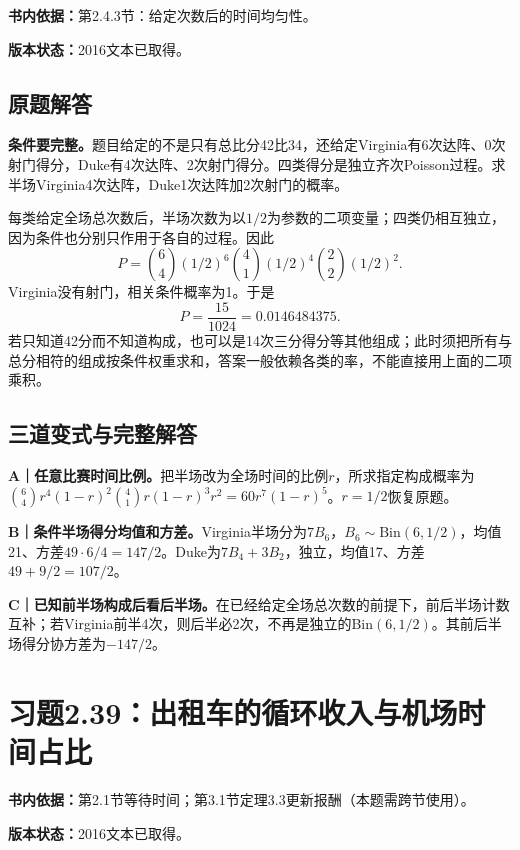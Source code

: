 \documentclass[
  11pt,
  a4paper,
  UTF8,fontset=fandol]{ctexart}
\let\OldSection\section
\renewcommand{\section}{\Needspace{7\baselineskip}\OldSection}
\let\OldSubsection\subsection
\renewcommand{\subsection}{\Needspace{5\baselineskip}\OldSubsection}
\begin{document}
\textbf{书内依据：}第2.4.3节：给定次数后的时间均匀性。

\textbf{版本状态：}2016文本已取得。

\subsection{原题解答}\label{ux539fux9898ux89e3ux7b54-37}

\textbf{条件要完整。}题目给定的不是只有总比分42比34，还给定Virginia有6次达阵、0次射门得分，Duke有4次达阵、2次射门得分。四类得分是独立齐次Poisson过程。求半场Virginia4次达阵，Duke1次达阵加2次射门的概率。

每类给定全场总次数后，半场次数为以\(1/2\)为参数的二项变量；四类仍相互独立，因为条件也分别只作用于各自的过程。因此
\[P=\binom64(1/2)^6\binom41(1/2)^4\binom22(1/2)^2.\]
Virginia没有射门，相关条件概率为1。于是
\[\boxed{P=\frac{15}{1024}=0.0146484375.}\]
若只知道42分而不知道构成，也可以是14次三分得分等其他组成；此时须把所有与总分相符的组成按条件权重求和，答案一般依赖各类的率，不能直接用上面的二项乘积。

\subsection{三道变式与完整解答}\label{ux4e09ux9053ux53d8ux5f0fux4e0eux5b8cux6574ux89e3ux7b54-37}

\textbf{A｜任意比赛时间比例。}把半场改为全场时间的比例\(r\)，所求指定构成概率为\(\binom64 r^4(1-r)^2\binom41r(1-r)^3r^2=60r^7(1-r)^5\)。\(r=1/2\)恢复原题。

\textbf{B｜条件半场得分均值和方差。}Virginia半场分为\(7B_6\)，\(B_6\sim\mathrm{Bin}(6,1/2)\)，均值21、方差\(49\cdot6/4=147/2\)。Duke为\(7B_4+3B_2\)，独立，均值17、方差\(49+9/2=107/2\)。

\textbf{C｜已知前半场构成后看后半场。}在已经给定全场总次数的前提下，前后半场计数互补；若Virginia前半4次，则后半必2次，不再是独立的Bin\((6,1/2)\)。其前后半场得分协方差为\(-147/2\)。

\newpage

\section{习题2.39：出租车的循环收入与机场时间占比}\label{ux4e60ux98982.39ux51faux79dfux8f66ux7684ux5faaux73afux6536ux5165ux4e0eux673aux573aux65f6ux95f4ux5360ux6bd4}

\textbf{书内依据：}第2.1节等待时间；第3.1节定理3.3更新报酬（本题需跨节使用）。

\textbf{版本状态：}2016文本已取得。
\end{document}
